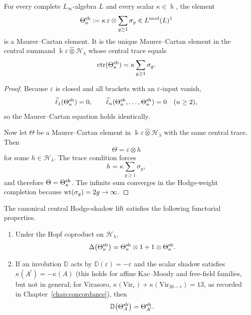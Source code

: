 \begin{proposition}
\label{prop:canonical-central-hodge-shadow-lift-chapter}
For every complete $L_\infty$-algebra $L$ and every scalar
$\kappa\in\Bbbk$, the element
\[
\Theta^{\mathrm{sh}}_{\kappa}:=\kappa\,\varepsilon\otimes \sum_{g\ge 1}\sigma_g
\in L^{\mathrm{mod}}(L)^1
\]
is a Maurer--Cartan element. It is the unique Maurer--Cartan element in
the central summand
\(\Bbbk\varepsilon\widehat\otimes\mathcal H_\lambda\) whose central
trace equals
\[
\operatorname{ctr}(\Theta^{\mathrm{sh}}_{\kappa})=\kappa\sum_{g\ge 1}\sigma_g.
\]
\end{proposition}

\begin{proof}
Because $\varepsilon$ is closed and all brackets with an
$\varepsilon$-input vanish,
\[
\widetilde\ell_1(\Theta^{\mathrm{sh}}_{\kappa})=0,
\qquad
\widetilde\ell_n(\Theta^{\mathrm{sh}}_{\kappa},\ldots,\Theta^{\mathrm{sh}}_{\kappa})=0
\quad(n\ge2),
\]
so the Maurer--Cartan equation holds identically.

Now let $\Theta$ be a Maurer--Cartan element in
\(\Bbbk\varepsilon\widehat\otimes\mathcal H_\lambda\) with the same
central trace. Then
\[
\Theta=\varepsilon\otimes h
\]
for some $h\in \mathcal H_{\lambda}$. The trace condition forces
\[
h=\kappa\sum_{g\ge 1}\sigma_g,
\]
and therefore $\Theta=\Theta^{\mathrm{sh}}_{\kappa}$. The infinite sum converges in the Hodge-weight completion because $\operatorname{wt}(\sigma_g)=2g\to\infty$.\qedhere
\end{proof}

\begin{proposition}
\label{prop:clutching-duality-shadow-lift-chapter}
The canonical central Hodge-shadow lift satisfies the following functorial properties.
\begin{enumerate}[label=\textup{(\roman*)}]
 \item Under the Hopf coproduct on $\mathcal H_{\lambda}$,
 \[
 \Delta\bigl(\Theta^{\mathrm{sh}}_{\kappa}\bigr)
 =\Theta^{\mathrm{sh}}_{\kappa}\otimes 1 + 1\otimes \Theta^{\mathrm{sh}}_{\kappa}.
 \]
 \item If an involution $\mathbb D$ acts by $\mathbb D(\varepsilon)=-\varepsilon$ and the scalar shadow satisfies $\kappa(A^!)=-\kappa(A)$ \textup{(}this holds for affine Kac--Moody and free-field families, but not in general; for Virasoro, $\kappa(\mathrm{Vir}_c) + \kappa(\mathrm{Vir}_{26-c}) = 13$, as recorded in Chapter~\ref{chap:concordance}\textup{)}, then
 \[
 \mathbb D\bigl(\Theta_A^{\mathrm{sh}}\bigr)=\Theta_{A^!}^{\mathrm{sh}}.
 \]
\end{enumerate}
\end{proposition}

